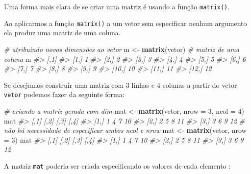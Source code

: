\documentclass[]{book}
\newenvironment{Shaded}{\begin{snugshade}}{\end{snugshade}}
\newcommand{\KeywordTok}[1]{\textcolor[rgb]{0.13,0.29,0.53}{\textbf{#1}}}
\newcommand{\DataTypeTok}[1]{\textcolor[rgb]{0.13,0.29,0.53}{#1}}
\newcommand{\DecValTok}[1]{\textcolor[rgb]{0.00,0.00,0.81}{#1}}
\newcommand{\StringTok}[1]{\textcolor[rgb]{0.31,0.60,0.02}{#1}}
\newcommand{\CommentTok}[1]{\textcolor[rgb]{0.56,0.35,0.01}{\textit{#1}}}
\newcommand{\NormalTok}[1]{#1}
\begin{document}
Uma forma mais clara de se criar uma matriz é usando a função
\texttt{matrix()}.

Ao aplicarmos a função \texttt{matrix()} a um vetor sem especificar
nenhum argumento ela produz uma matriz de uma coluna.

\begin{Shaded}
\begin{Highlighting}[]
\CommentTok{# atribuindo novas dimensões ao vetor}
\NormalTok{m <-}\StringTok{ }\KeywordTok{matrix}\NormalTok{(vetor)  }\CommentTok{# matriz de uma coluna}
\NormalTok{m}
\CommentTok{#>       [,1]}
\CommentTok{#>  [1,]    1}
\CommentTok{#>  [2,]    2}
\CommentTok{#>  [3,]    3}
\CommentTok{#>  [4,]    4}
\CommentTok{#>  [5,]    5}
\CommentTok{#>  [6,]    6}
\CommentTok{#>  [7,]    7}
\CommentTok{#>  [8,]    8}
\CommentTok{#>  [9,]    9}
\CommentTok{#> [10,]   10}
\CommentTok{#> [11,]   11}
\CommentTok{#> [12,]   12}
\end{Highlighting}
\end{Shaded}

Se desejamos construir uma matriz com 3 linhas e 4 colunas a partir do
vetor \texttt{vetor} podemos fazer da seguinte forma:

\begin{Shaded}
\begin{Highlighting}[]
\CommentTok{# criando a matriz gerada com dim}
\NormalTok{mat <-}\StringTok{ }\KeywordTok{matrix}\NormalTok{(vetor, }\DataTypeTok{nrow =} \DecValTok{3}\NormalTok{, }\DataTypeTok{ncol =} \DecValTok{4}\NormalTok{)}
\NormalTok{mat}
\CommentTok{#>      [,1] [,2] [,3] [,4]}
\CommentTok{#> [1,]    1    4    7   10}
\CommentTok{#> [2,]    2    5    8   11}
\CommentTok{#> [3,]    3    6    9   12}
\CommentTok{# não há necessidade de especificar ambos ncol e nrow}
\NormalTok{mat <-}\StringTok{ }\KeywordTok{matrix}\NormalTok{(vetor, }\DataTypeTok{nrow =} \DecValTok{3}\NormalTok{)}
\NormalTok{mat}
\CommentTok{#>      [,1] [,2] [,3] [,4]}
\CommentTok{#> [1,]    1    4    7   10}
\CommentTok{#> [2,]    2    5    8   11}
\CommentTok{#> [3,]    3    6    9   12}
\end{Highlighting}
\end{Shaded}

A matriz \texttt{mat} poderia ser criada especificando os valores de
cada elemento :
\end{document}
